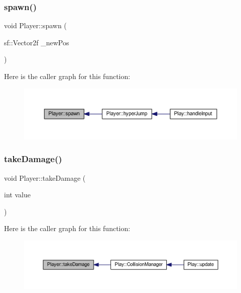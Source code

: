 \subsubsection{\texorpdfstring{spawn()}{spawn()}}
{\footnotesize\ttfamily void Player\+::spawn (\begin{DoxyParamCaption}\item[{sf\+::\+Vector2f}]{\+\_\+new\+Pos }\end{DoxyParamCaption})}

Here is the caller graph for this function\+:
\nopagebreak
\begin{figure}[H]
\begin{center}
\leavevmode
\includegraphics[width=350pt]{class_player_a6258e03705f093472c49af6d909fdad1_icgraph}
\end{center}
\end{figure}
\mbox{\label{class_player_af92779e4722eee7813fd6497e3e15e18}} 
\subsubsection{\texorpdfstring{take\+Damage()}{takeDamage()}}
{\footnotesize\ttfamily void Player\+::take\+Damage (\begin{DoxyParamCaption}\item[{int}]{value }\end{DoxyParamCaption})}

Here is the caller graph for this function\+:
\nopagebreak
\begin{figure}[H]
\begin{center}
\leavevmode
\includegraphics[width=350pt]{class_player_af92779e4722eee7813fd6497e3e15e18_icgraph}
\end{center}
\end{figure}
\mbox{\label{class_player_a71a11d7f337c312add448fe752e55b51}} 
